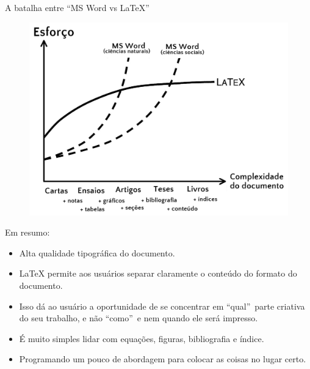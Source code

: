 \documentclass[10pt]{beamer}
\begin{document}
\begin{frame}{A batalha entre \textquotedblleft MS Word vs \LaTeX\textquotedblright}
    

\begin{figure}[H]
    \centering
\includegraphics[width=1\textwidth]{AAUgraphics/SFhtj}
%   
\end{figure}
\end{frame}

\begin{frame}{Em resumo:}
\begin{itemize}
\item Alta qualidade tipográfica do documento.
\pause
\item \LaTeX \hspace{0.1cm} permite aos usuários separar claramente o conteúdo do formato do documento.
\pause
\item Isso dá ao usuário a oportunidade de se concentrar em \textquotedblleft qual\textquotedblright \ parte criativa do seu trabalho, e não \textquotedblleft como\textquotedblright \ e nem quando ele será impresso.
\pause
\item É muito simples lidar com equações, figuras, bibliografia e índice.
\pause
\item Programando um pouco de abordagem para colocar as coisas no lugar certo.
\end{itemize}

\end{frame}
\end{document}
